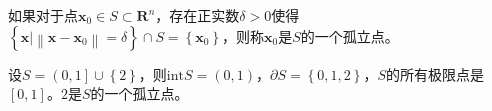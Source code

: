 \documentclass[main.tex]{subfiles}
\begin{document}
\begin{definition}[孤立点]
如果对于点$\mathbf{x}_0\in S\subset\mathbf{R}^n$，存在正实数$\delta>0$使得$\left\{\mathbf{x}|\left\|\mathbf{x}-\mathbf{x}_0\right\|=\delta\right\}\cap S=\left\{\mathbf{x}_0\right\}$，则称$\mathbf{x}_0$是$S$的一个孤立点。
\end{definition}

\begin{example}
设$S=\left(0,1\right]\cup\left\{2\right\}$，则$\mathrm{int}S=\left(0,1\right)$，$\partial S=\left\{0,1,2\right\}$，$S$的所有极限点是$\left[0,1\right]$。$2$是$S$的一个孤立点。
\end{example}
\end{document}
